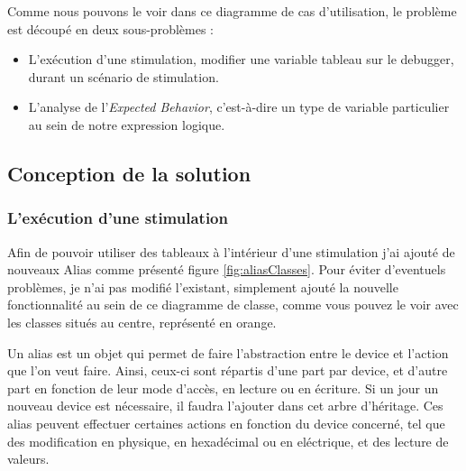  Comme nous pouvons le voir dans ce diagramme de cas d'utilisation, le problème est découpé en deux sous-problèmes : 
 \begin{itemize}
 	\item L'exécution d'une stimulation, modifier une variable tableau sur le debugger, durant un scénario de stimulation. 
 	\item L'analyse de l'\textit{Expected Behavior}, c'est-à-dire un type de variable particulier au sein de notre expression logique.
 \end{itemize}
 

\subsection{Conception de la solution}
\subsubsection{L'exécution d'une stimulation}
Afin de pouvoir utiliser des tableaux à l'intérieur d'une stimulation j'ai ajouté de nouveaux Alias comme présenté figure \ref{fig:aliasClasses}. Pour éviter d'eventuels problèmes, je n'ai pas modifié l'existant, simplement ajouté la nouvelle fonctionnalité au sein de ce diagramme de classe, comme vous pouvez le voir avec les classes situés au centre, représenté en orange.

Un alias est un objet qui permet de faire l'abstraction entre le device et l'action que l'on veut faire. Ainsi, ceux-ci sont répartis d'une part par device, et d'autre part en fonction de leur mode d'accès, en lecture ou en écriture. Si un jour un nouveau device est nécessaire, il faudra l'ajouter dans cet arbre d'héritage. Ces alias peuvent effectuer certaines actions en fonction du device concerné, tel que des modification en physique, en hexadécimal ou en eléctrique, et des lecture de valeurs.

